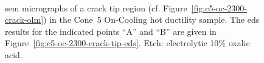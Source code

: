 {\begin{figure}
    \centering
     \\
    \caption{\Gls{sem} micrographs of a crack tip region (cf. Figure~\ref{fig:c5-oc-2300-crack-olm}) in the Cone~5 On-Cooling \protect{} hot ductility sample. The \gls{eds} results for the indicated points ``A'' and ``B'' are given in Figure~\ref{fig:c5-oc-2300-crack-tip-eds}. Etch: electrolytic 10\% oxalic acid.}
    \label{fig:c5-oc-2300-crack-tip-sem}
\end{figure}

}
